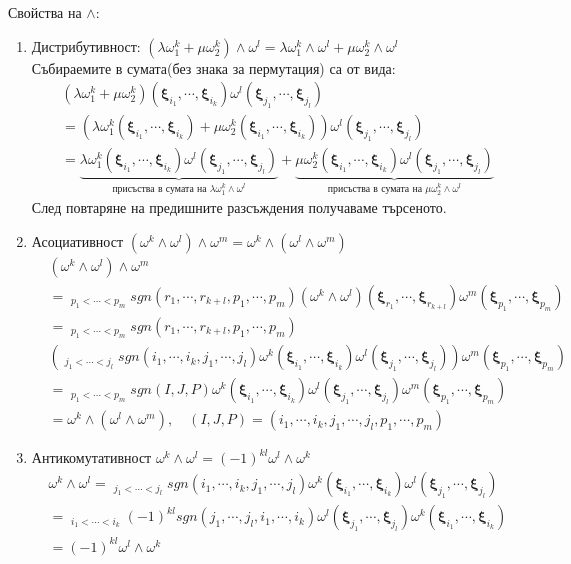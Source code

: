 \documentclass[12pt]{article}
\newcommand\myxi[0]{\boldsymbol{\xi}}
\begin{document}
\begin{large}
Свойства на $\wedge$:
\begin{enumerate}
\item Дистрибутивност: $(\lambda\omega^k_1+\mu\omega^k_2) \wedge \omega^l = \lambda\omega^k_1\wedge\omega^l + \mu \omega^k_2\wedge\omega^l$ \\
Събираемите в сумата(без знака за пермутация) са от вида:
\begin{align*}
&(\lambda\omega^k_1+\mu\omega^k_2)(\myxi_{i_1},\cdots,\myxi_{i_k})\omega^l(\myxi_{j_1},\cdots,\myxi_{j_l}) \\
&=(\lambda\omega^k_1(\myxi_{i_1},\cdots,\myxi_{i_k})+\mu\omega^k_2(\myxi_{i_1},\cdots,\myxi_{i_k}))\omega^l(\myxi_{j_1},\cdots,\myxi_{j_l}) \\
&=\underbrace{\lambda\omega^k_1(\myxi_{i_1},\cdots,\myxi_{i_k})\omega^l(\myxi_{j_1},\cdots,\myxi_{j_l})}_{\text{присъства в сумата на $\lambda\omega^k_1\wedge\omega^l$}}+
\underbrace{\mu\omega^k_2(\myxi_{i_1},\cdots,\myxi_{i_k})\omega^l(\myxi_{j_1},\cdots,\myxi_{j_l})}_{\text{присъства в сумата на $\mu\omega^k_2\wedge\omega^l$}}
\end{align*}
След повтаряне на предишните разсъждения получаваме търсеното.
\item Асоциативност $(\omega^k \wedge \omega^l) \wedge \omega^m=\omega^k \wedge (\omega^l \wedge \omega^m)$
\begin{align*}
&(\omega^k \wedge \omega^l) \wedge \omega^m  \\ 
&=\mathop{\sum_{r_1<\cdots<r_{k+l}}}_{p_1<\cdots<p_m} sgn(r_1,\cdots,r_{k+l},p_1, \cdots,p_m)(\omega^k \wedge \omega^l)(\myxi_{r_1},\cdots,\myxi_{r_{k+l}})\omega^m(\myxi_{p_1},\cdots,\myxi_{p_m}) \\
&=\mathop{\sum_{r_1<\cdots<r_{k+l}}}_{p_1<\cdots<p_m} sgn(r_1,\cdots,r_{k+l},p_1, \cdots,p_m) \\ &\left(\mathop{\sum_{i_1<\cdots<i_k}}_{j_1<\cdots<j_l} sgn(i_1,\cdots,i_k,j_1, \cdots,j_l)\omega^k(\myxi_{i_1},\cdots,\myxi_{i_k})\omega^l(\myxi_{j_1},\cdots,\myxi_{j_l}) \right)\omega^m(\myxi_{p_1},\cdots,\myxi_{p_m}) \\
&=\mathop{\mathop{\sum_{i_1<\cdots<i_k}}_{j_1<\cdots<j_l}}_{p_1<\cdots<p_m} sgn(I,J,P) \omega^k(\myxi_{i_1},\cdots,\myxi_{i_k})\omega^l(\myxi_{j_1},\cdots,\myxi_{j_l})\omega^m(\myxi_{p_1},\cdots,\myxi_{p_m}) \\
&= \omega^k \wedge (\omega^l \wedge \omega^m), \quad (I,J,P)=(i_1,\cdots,i_k,j_1,\cdots,j_l,p_1,\cdots,p_m)
\end{align*}
\item Антикомутативност $\omega^k \wedge \omega^l=(-1)^{kl}\omega^l \wedge \omega^k$
\begin{align*}
&\omega^k \wedge \omega^l=\mathop{\sum_{i_1<\cdots<i_k}}_{j_1<\cdots<j_l} sgn(i_1,\cdots,i_k,j_1, \cdots,j_l)\omega^k(\myxi_{i_1},\cdots,\myxi_{i_k})\omega^l(\myxi_{j_1},\cdots,\myxi_{j_l})\\
&=\mathop{\sum_{j_1<\cdots<j_l}}_{i_1<\cdots<i_k} (-1)^{kl}sgn(j_1, \cdots,j_l,i_1,\cdots,i_k)\omega^l(\myxi_{j_1},\cdots,\myxi_{j_l})\omega^k(\myxi_{i_1},\cdots,\myxi_{i_k}) \\
&=(-1)^{kl}\omega^l \wedge \omega^k
\end{align*}
\end{enumerate}


\end{large}
\end{document}
